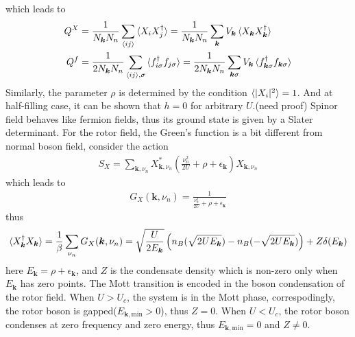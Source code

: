 \documentclass{article}
\begin{document}
which leads to
\begin{align*}
    Q^X &= \frac{1}{N_{\bm{k}}N_n}\sum_{\braket{ij}}\braket{X_iX_j^{\dagger}} = \frac{1}{N_{\bm{k}}N_n}\sum_{\bm{k}}V_{\bm{k}}\braket{X_{\bm{k}}X_{\bm{k}}^{\dagger}} \\
    Q^f &= \frac{1}{2N_{\bm{k}}N_n}\sum_{\braket{ij},\sigma}\braket{f_{i\sigma}^{\dagger}f_{j\sigma}} = \frac{1}{2N_{\bm{k}}N_n}\sum_{\bm{k}\sigma}V_{\bm{k}}\braket{f_{\bm{k}\sigma}^{\dagger}f_{\bm{k}\sigma}}
\end{align*}
Similarly, the parameter $\rho$ is determined by the condition $\braket{|X_i|^2} = 1$. And at half-filling case, it can be shown that $h=0$ for arbitrary $U$.(need proof) Spinor field behaves like fermion fields, thus its ground state is 
given by a Slater determinant. For the rotor field, the Green's function is a bit different from normal boson field, consider the action
\begin{align*}
    S_X = \sum_{\bm{k},\nu_n} X_{\bm{k},\nu_n}^*\left(\frac{\nu_n^2}{2U}+\rho+\epsilon_{\bm{k}} \right) X_{\bm{k},\nu_n}
\end{align*}
which leads to 
\begin{align*}
 G_X(\bm{k},\nu_n) = \frac{1}{\frac{\nu_n^2}{2U}+\rho+\epsilon_{\bm{k}}}
\end{align*}
thus 
\begin{align*}
    \braket{X_{\bm{k}}^{\dagger}X_{\bm{k}}} = \frac{1}{\beta}\sum_{\nu_n} G_X(\bm{k},\nu_n) = \sqrt{\frac{U}{2E_{\bm{k}}}}\left(n_B(\sqrt{2UE_{\bm{k}}})-n_B(-\sqrt{2UE_{\bm{k}}}) \right) +Z\delta(E_{\bm{k}})
\end{align*}
here $E_{\bm{k}} = \rho + \epsilon_{\bm{k}}$, and $Z$ is the condensate density which is non-zero only when $E_{\bm{k}}$ has zero points. The Mott transition is encoded in the boson condensation of the rotor field. When $U>U_c$,
the system is in the Mott phase, correspodingly, the rotor boson is gapped($E_{\bm{k},\text{min}}>0$), thus $Z=0$. When $U<U_c$, the rotor boson condenses at zero frequency and zero energy, thus $E_{\bm{k},\text{min}} = 0$ and $Z\neq 0$. 
\end{document}
